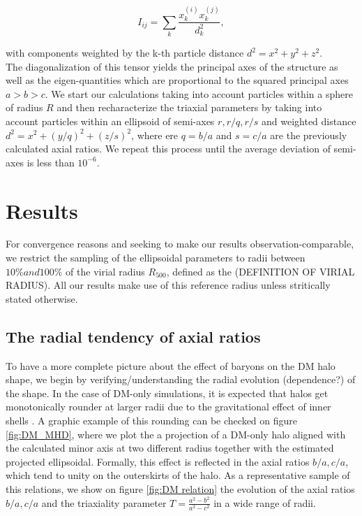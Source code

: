 \documentclass[a4paper,fleqn,usenatbib]{mnras}
\begin{document}
\begin{equation}
I_{ij} = \sum_k \frac{x_k^{(i)}x_k^{(j)}}{d^2_k},
\label{eq:inertia}
\end{equation}

with components weighted by the k-th particle distance $d^2=x^2+y^2+z^2$.\\

The diagonalization of this tensor yields the principal axes of the structure as well as the eigen-quantities which are proportional to the squared principal axes $a>b>c$. We start our calculations taking into account particles within a sphere of radius $R$ and then recharacterize the triaxial parameters by taking into account particles within an ellipsoid of semi-axes $r,r/q,r/s$ and weighted distance $d^2=x^2+(y/q)^2+(z/s)^2$, where ere $q = b/a$ and $s=c/a$ are the previously calculated axial ratios. We repeat this process until the average deviation of semi-axes is less than $10^{-6}$.\\

\section{Results}
For convergence reasons and seeking to make our results observation-comparable, we restrict the sampling of the ellipsoidal parameters to radii between $10\% and 100\%$ of the virial radius $R_500$, defined as the (DEFINITION OF VIRIAL RADIUS). All our results make use of this reference radius unless stritically stated otherwise.\\ 

\subsection{The radial tendency of axial ratios}
To have a more complete picture about the effect of baryons on the DM halo shape, we begin by verifying/understanding the radial evolution (dependence?) of the shape. In the case of DM-only simulations, it is expected that halos get monotonically rounder at larger radii due to the gravitational effect of inner shells \citep{Vera-Ciro et al. 2012}. A graphic example of this rounding can be checked on figure \ref{fig:DM_MHD}, where we plot the a projection of a DM-only halo aligned with the calculated minor axis at two different radius together with the estimated projected ellipsoidal. Formally, this effect is reflected in the axial ratios $b/a,c/a$, which tend to unity on the outerskirts of the halo. As a representative sample of this relations, we show on figure \ref{fig:DM relation} the evolution of the axial ratios $b/a,c/a$ and the triaxiality parameter $T=\frac{a^2-b^2}{a^2-c^2}$ in a wide range of radii.\\
\end{document}
